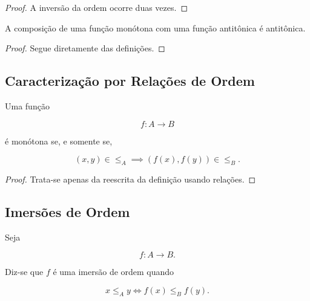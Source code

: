 \documentclass[../../main]{subfiles}
\begin{document}
\begin{proof}

	A inversão da ordem ocorre duas vezes.

\end{proof}

\begin{prop}
	\label{prop:matematica:funcoes:ordem:monotona-antitona}

	A composição de uma função monótona com uma função antitônica é
	antitônica.

\end{prop}

\begin{proof}

	Segue diretamente das definições.

\end{proof}

\subsection{Caracterização por Relações de Ordem}

\begin{prop}
	\label{prop:matematica:funcoes:ordem:caracterizacao}

	Uma função

	\[
		f:A\to B
	\]

	é monótona se, e somente se,

	\[
		(x,y)\in\le_A
		\implies
		(f(x),f(y))\in\le_B.
	\]

\end{prop}

\begin{proof}

	Trata-se apenas da reescrita da definição usando relações.

\end{proof}

\subsection{Imersões de Ordem}

\begin{defn}
	\label{def:matematica:funcoes:ordem:imersao}

	Seja

	\[
		f:A\to B.
	\]

	Diz-se que \(f\) é uma imersão de ordem quando

	\[
		x\le_A y
		\iff
		f(x)\le_B f(y).
	\]

\end{defn}
\end{document}
